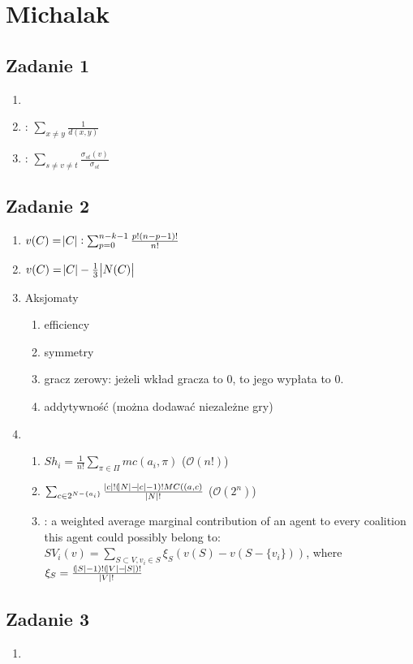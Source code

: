 \section{Michalak}

\subsection{Zadanie 1}
\begin{enumerate}
  \item
  \item
    :
        $\sum_{x\neq y}{\frac{1}{d(x,y)}}$
      \item
        :
        $\sum_{s\neq v \neq t} \frac{\sigma_{st}(v)}{\sigma_{st}}$

\end{enumerate}

\subsection{Zadanie 2}
\begin{enumerate}
  \item
    $v(C) = \abs{C}: \sum^{n - k - 1}_{p = 0} \frac{p! (n - p - 1)!}{n!}$
  \item
    $ v(C) = \abs{C} - \frac{1}{3} \abs{N(C)} $
  \item
    Aksjomaty
    \begin{enumerate}
      \item
        efficiency
      \item
        symmetry
      \item
        gracz zerowy: jeżeli wkład gracza to $0$, to jego wypłata to $0$.
      \item
        addytywność (można dodawać niezależne gry)
    \end{enumerate}
  \item
    \begin{enumerate}
      \item
        $Sh_i = \frac{1}{n!} \sum_{\pi \in \Pi} mc(a_i, \pi)$
        ($\mathcal{O}(n!)$)
      \item
        $\sum_{c\in 2^{N-\{a_i\}}} \frac{\abs{c}!(\abs{N} - \abs{c} -1)!MC((a,c)}{\abs{N}!}$
        ($\mathcal{O}(2^n)$)
      \item
        : a weighted average marginal contribution of
        an agent to every coalition this agent could possibly belong to:
        $SV_i(v) = \sum_{S\subset V, v_i \in S} \xi_S (v(S) - v(S - \{v_i\}))$, where
        $\xi_S = \frac{(\abs{S} - 1)! (\abs{V} - \abs{S})!}{\abs{V}!}$
    \end{enumerate}
\end{enumerate}

\subsection{Zadanie 3}
\begin{enumerate}
  \item
\end{enumerate}

